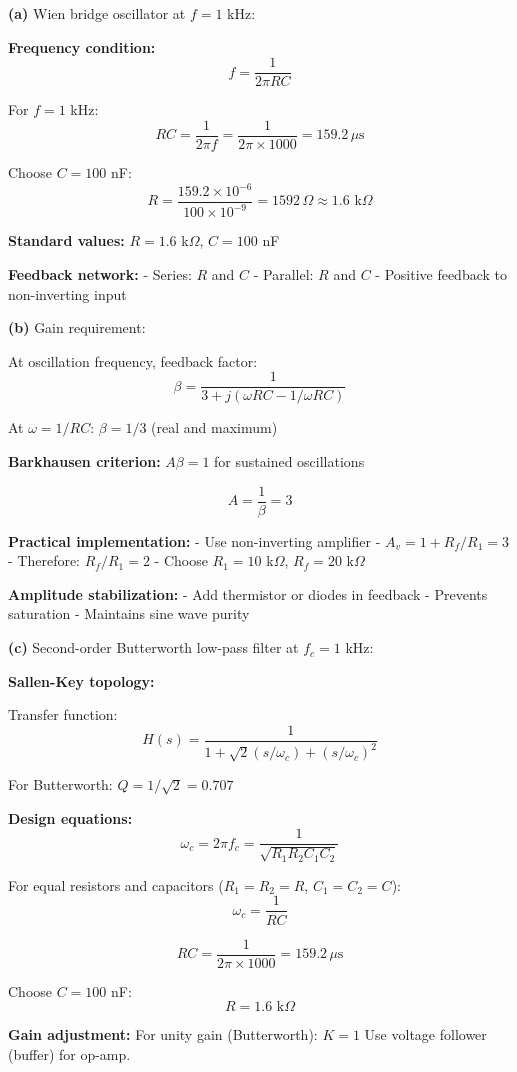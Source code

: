 \documentclass[12pt,a4paper]{article}
\begin{document}
\begin{solution}
\textbf{(a)} Wien bridge oscillator at $f = 1$ kHz:

\textbf{Frequency condition:}
$$f = \frac{1}{2\pi RC}$$

For $f = 1$ kHz:
$$RC = \frac{1}{2\pi f} = \frac{1}{2\pi \times 1000} = 159.2\,\mu\text{s}$$

Choose $C = 100$ nF:
$$R = \frac{159.2 \times 10^{-6}}{100 \times 10^{-9}} = 1592\,\Omega \approx 1.6\text{ k}\Omega$$

\textbf{Standard values:} $R = 1.6$ k$\Omega$, $C = 100$ nF

\textbf{Feedback network:}
- Series: $R$ and $C$
- Parallel: $R$ and $C$
- Positive feedback to non-inverting input

\textbf{(b)} Gain requirement:

At oscillation frequency, feedback factor:
$$\beta = \frac{1}{3 + j(\omega RC - 1/\omega RC)}$$

At $\omega = 1/RC$: $\beta = 1/3$ (real and maximum)

\textbf{Barkhausen criterion:} $A\beta = 1$ for sustained oscillations

$$A = \frac{1}{\beta} = 3$$

\textbf{Practical implementation:}
- Use non-inverting amplifier
- $A_v = 1 + R_f/R_1 = 3$
- Therefore: $R_f/R_1 = 2$
- Choose $R_1 = 10$ k$\Omega$, $R_f = 20$ k$\Omega$

\textbf{Amplitude stabilization:}
- Add thermistor or diodes in feedback
- Prevents saturation
- Maintains sine wave purity

\textbf{(c)} Second-order Butterworth low-pass filter at $f_c = 1$ kHz:

\textbf{Sallen-Key topology:}

Transfer function:
$$H(s) = \frac{1}{1 + \sqrt{2}(s/\omega_c) + (s/\omega_c)^2}$$

For Butterworth: $Q = 1/\sqrt{2} = 0.707$

\textbf{Design equations:}
$$\omega_c = 2\pi f_c = \frac{1}{\sqrt{R_1 R_2 C_1 C_2}}$$

For equal resistors and capacitors ($R_1 = R_2 = R$, $C_1 = C_2 = C$):
$$\omega_c = \frac{1}{RC}$$

$$RC = \frac{1}{2\pi \times 1000} = 159.2\,\mu\text{s}$$

Choose $C = 100$ nF:
$$R = 1.6\text{ k}\Omega$$

\textbf{Gain adjustment:}
For unity gain (Butterworth): $K = 1$
Use voltage follower (buffer) for op-amp.


\end{solution}
\end{document}
